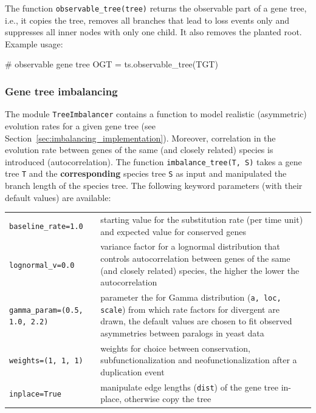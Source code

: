 \documentclass[hidelinks,11pt]{scrreprt}
\begin{document}
The function \texttt{observable\_tree(tree)} returns the observable part of a gene tree, i.e., it copies the tree, removes all branches that lead to loss events only and suppresses all inner nodes with only one child. 
It also removes the planted root.
Example usage:
\vspace{2mm}
\begin{python}
# observable gene tree
OGT = ts.observable_tree(TGT)
\end{python}
\vspace{2mm}


\subsubsection{Gene tree imbalancing}

The module \texttt{TreeImbalancer} contains a function to model realistic (asymmetric) evolution rates for a given gene tree (see Section~\ref{sec:imbalancing_implementation}).
Moreover, correlation in the evolution rate between genes of the same (and closely related) species is introduced (autocorrelation).
The function \texttt{imbalance\_tree(T, S)} takes a gene tree \texttt{T} and the \textbf{corresponding} species tree \texttt{S} as input and manipulated the branch length of the species tree.
The following keyword parameters (with their default values) are available:

\vspace{3mm}
\renewcommand{\arraystretch}{1.5}
\begin{tabularx}{0.95\textwidth} { >{\raggedright\arraybackslash}p{4cm} >{\raggedright\arraybackslash}X }
	\texttt{baseline\_rate=1.0} & starting value for the substitution rate (per time unit) and expected value for conserved genes\\
	\texttt{lognormal\_v=0.0}  & variance factor for a lognormal distribution that controls autocorrelation between genes of the same (and closely related) species, the higher the lower the auto\-corre\-la\-tion\\
	\texttt{gamma\_param=(0.5, 1.0, 2.2)}  & parameter the for Gamma distribution (\texttt{a, loc, scale}) from which rate factors for divergent are drawn, the default values are chosen to fit observed asymmetries between paralogs in yeast data \citep{byrne2007}\\
	\texttt{weights=(1, 1, 1)}  & weights for choice between conservation,
	subfunctionalization and neofunctionalization after a duplication event\\
	\texttt{inplace=True}  & manipulate edge lengths (\texttt{dist}) of the gene tree in-place, otherwise copy the tree\\
\end{tabularx}
\vspace{3mm}
\end{document}
